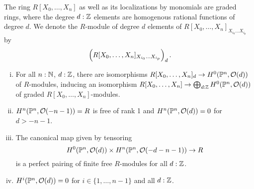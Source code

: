 \begin{definition}
  The ring $R[X_0,\dots,X_n]$ as well as its localizations by monomials are graded rings,
  where the degree $d:\mathbb{Z}$ elements are homogenous rational functions of degree $d$.
  We denote the $R$-module of degree $d$ elements of $R[X_0,\dots,X_n]_{X_{i_0}\dots X_{i_p}}$ by
  \[
    \left(R[X_0,\dots,X_n]_{X_{i_0}\dots X_{i_p}}\right)_d
    \rlap{.}
  \]
\end{definition}

\begin{theorem}
  \begin{enumerate}[(i)]
  \item For all $n:\mathbb{N}$, $d:\mathbb{Z}$, there are isomorphisms $R[X_0,\dots,X_n]_d\to H^0(\mathbb{P}^n,\mathcal O(d))$ of $R$-modules, inducing an isomorphism $R[X_0,\dots,X_n]\to \bigoplus_{d:\mathbb{Z}} H^0(\mathbb{P}^n,\mathcal O(d))$ of graded $R[X_0,\dots,X_n]$-modules.
  \item $H^n(\mathbb{P}^n,\mathcal O(-n-1))=R$ is free of rank 1 and $H^n(\mathbb{P}^n,\mathcal O(d))=0$ for $d>-n-1$.
  \item The canonical map given by tensoring
    \[
      H^0(\mathbb{P}^n,\mathcal O(d)) \times H^n(\mathbb{P}^n,\mathcal O(-d-n-1))\to R
    \]
    is a perfect pairing of finite free $R$-modules for all $d:\mathbb{Z}$.
  \item $H^i(\mathbb{P}^n,\mathcal O(d))=0$ for $i\in\{1,\dots,n-1\}$ and all $d:\mathbb{Z}$.
  \end{enumerate}
\end{theorem}

